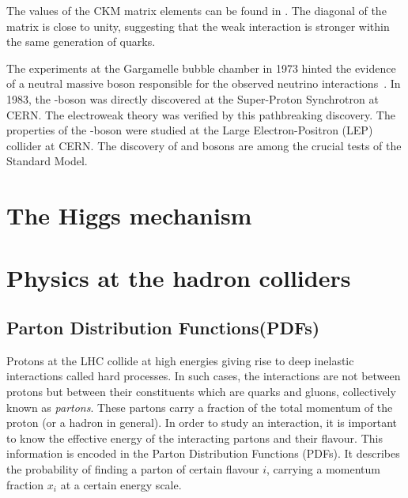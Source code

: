 The values of the CKM matrix elements can be found in \cite{pdg2024}. The diagonal
of the matrix is close to unity, suggesting that the weak interaction is stronger within
the same generation of quarks. 

The experiments at the Gargamelle bubble chamber in 1973 hinted the evidence of a neutral
massive boson responsible for the observed neutrino interactions~\cite{HASERT1973138}. In 1983, the \PZ-boson
was directly discovered at the Super-Proton Synchrotron at CERN. The electroweak theory
was verified by this pathbreaking discovery. The properties of the \PZ-boson were
studied at the Large Electron-Positron (LEP) collider at CERN. The discovery of \PZ and \PW 
bosons are among the crucial tests of the Standard Model. 


\section{The Higgs mechanism}

\section{Physics at the hadron colliders}

\subsection*{Parton Distribution Functions(PDFs)}
Protons at the LHC collide at high energies giving rise to deep inelastic interactions called hard processes.
In such cases, the interactions are not between protons but between their constituents which are
quarks and gluons, collectively known as \textit{partons}. These partons carry a fraction of the total
momentum of the proton (or a hadron in general). In order to study an interaction, it is important to
know the effective energy of the interacting partons and their flavour. This information is encoded in 
the Parton Distribution Functions (PDFs). It describes the probability of finding a parton of 
certain flavour $i$, carrying a momentum fraction $x_i$ at a certain energy scale.

